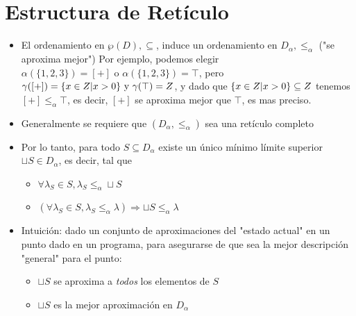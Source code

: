 \documentclass[11pt]{article}
\begin{document}
\section*{Estructura de Retículo}
\label{sec:org08e7ba6}
\begin{itemize}
\item El ordenamiento en \(\wp(D), \subseteq\), induce un ordenamiento en
\(D_\alpha, \leq_\alpha\) ("se aproxima mejor") Por ejemplo, podemos
elegir \(\alpha(\{1, 2, 3\}) = [+] \mbox{ o } \alpha(\{1, 2, 3\}) =
  \top\), pero \(\gamma([+]) = \{x \in Z \arrowvert x > 0\} \mbox{ y }
  \gamma(\top) = Z\), y dado que \(\{x \in Z \arrowvert x > 0\}
  \subseteq Z\) tenemos  \([+] \leq_\alpha \top\), es decir, \([+]\) se
aproxima mejor que \(\top\), es mas preciso.
\item Generalmente se requiere que \((D_\alpha, \leq_\alpha)\) sea una retículo completo
\item Por lo tanto, para todo \(S \subseteq D_\alpha\) existe un único
mínimo límite superior \(\sqcup S \in D_\alpha\), es decir, tal que
\begin{itemize}
\item \(\forall \lambda_S \in S, \lambda_S \leq_\alpha \sqcup S\)
\item \((\forall \lambda_S \in S, \lambda_S \leq_\alpha \lambda) \Rightarrow \sqcup S \leq_\alpha \lambda\)
\end{itemize}
\item Intuición: dado un conjunto de aproximaciones del "estado actual" en
un punto dado en un programa, para asegurarse de que sea la mejor
descripción "general" para el punto:
\begin{itemize}
\item \(\sqcup S\) se aproxima a \emph{todos} los elementos de \(S\)
\item \(\sqcup S\) es la mejor aproximación en \(D_\alpha\)
\end{itemize}
\end{itemize}
\end{document}
